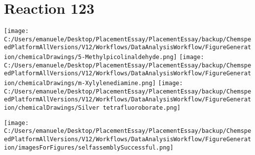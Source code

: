 \documentclass{article}%
\begin{document}
\section*{Reaction 123}%
%
\begin{scheme}[H]%
\begin{minipage}{0.5\textwidth}%
\texttt{[image: C:/Users/emanuele/Desktop/PlacementEssay/PlacementEssay/backup/ChemspeedPlatformAllVersions/V12/Workflows/DataAnalysisWorkflow/FigureGeneration/chemicalDrawings/5-Methylpicolinaldehyde.png]}%
\texttt{[image: C:/Users/emanuele/Desktop/PlacementEssay/PlacementEssay/backup/ChemspeedPlatformAllVersions/V12/Workflows/DataAnalysisWorkflow/FigureGeneration/chemicalDrawings/m-Xylylenediamine.png]}%
\texttt{[image: C:/Users/emanuele/Desktop/PlacementEssay/PlacementEssay/backup/ChemspeedPlatformAllVersions/V12/Workflows/DataAnalysisWorkflow/FigureGeneration/chemicalDrawings/Silver tetrafluoroborate.png]}%
\end{minipage}%
\begin{minipage}{0.5\textwidth}%
\begin{center}%
\texttt{[image: C:/Users/emanuele/Desktop/PlacementEssay/PlacementEssay/backup/ChemspeedPlatformAllVersions/V12/Workflows/DataAnalysisWorkflow/FigureGeneration/imagesForFigures/selfassemblySuccessful.png]}%
\end{center}%
\end{minipage}%
\caption{Self-assembly of components 3, 18, with Silver(I) in a 3.0:1.5:1.0 molar ratio in CH$_3$CN at 60\textdegree C for 40h. These are the reagents (starting materials) for reaction 123.}%
\end{scheme}%
\end{document}
